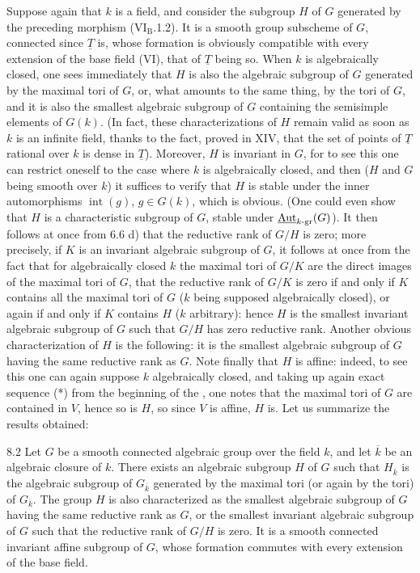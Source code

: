 Suppose again that $k$ is a field, and consider the subgroup $H$ of $G$ generated by the preceding morphism (\cf VI$_{\mathrm B}$.1.2). It is a smooth group subscheme of $G$, connected since $\underline T$ is, whose formation is obviously compatible with every extension of the base field (\cf VI), that of $\underline T$ being so. When $k$ is algebraically closed, one sees immediately that $H$ is also the algebraic subgroup of $G$ generated by the maximal tori of $G$, or, what amounts to the same thing, by the tori of $G$, and it is also the smallest algebraic subgroup of $G$ containing the semisimple elements of $G(k)$. (In fact, these characterizations of $H$ remain valid as soon as $k$ is an infinite field, thanks to the fact, proved in XIV, that the set of points of $\underline T$ rational over $k$ is dense in $\underline T$). Moreover, $H$ is invariant in $G$, for to see this one can restrict oneself to the case where $k$ is algebraically closed, and then ($H$ and $G$ being smooth over $k$) it suffices to verify that $H$ is stable under the inner automorphisms $\operatorname{int}(g)$, $g\in G(k)$, which is obvious. (One could even show that $H$ is a characteristic subgroup of $G$, \ie stable under $\underline{\operatorname{Aut}}_{k\text{-gr}}(G)$). It then follows at once from 6.6 d) that the reductive rank of $G/H$ is zero; more precisely, if $K$ is an invariant algebraic subgroup of $G$, it follows at once from the fact that for algebraically closed $k$ the maximal tori of $G/K$ are the direct images of the maximal tori of $G$, that the reductive rank of $G/K$ is zero if and only if $K$ contains all the maximal tori of $G$ ($k$ being supposed algebraically closed), or again if and only if $K$ contains $H$ ($k$ arbitrary): hence $H$ is the smallest invariant algebraic subgroup of $G$ such that $G/H$ has zero reductive rank. Another obvious characterization of $H$ is the following: it is the smallest algebraic subgroup of $G$ having the same reductive rank as $G$. Note finally that $H$ is affine: indeed, to see this one can again suppose $k$ algebraically closed, and taking up again exact sequence (*) from the beginning of the \No, one notes that the maximal tori of $G$ are contained in $V$, hence so is $H$, so since $V$ is affine, $H$ is. Let us summarize the results obtained:
\begin{proposition}{8.2}\label{XII.8.2}
Let $G$ be a smooth connected algebraic group over the field $k$, and let $\overline k$ be an algebraic closure of $k$. There exists an algebraic subgroup $H$ of $G$ such that $H_{\overline k}$ is the algebraic subgroup of $G_{\overline k}$ generated by the maximal tori (or again by the tori) of $G_{\overline k}$. The group $H$ is also characterized as the smallest algebraic subgroup of $G$ having the same reductive rank as $G$, or the smallest invariant algebraic subgroup of $G$ such that the reductive rank of $G/H$ is zero. It is a smooth connected invariant affine subgroup of $G$, whose formation commutes with every extension of the base field.
\end{proposition}

